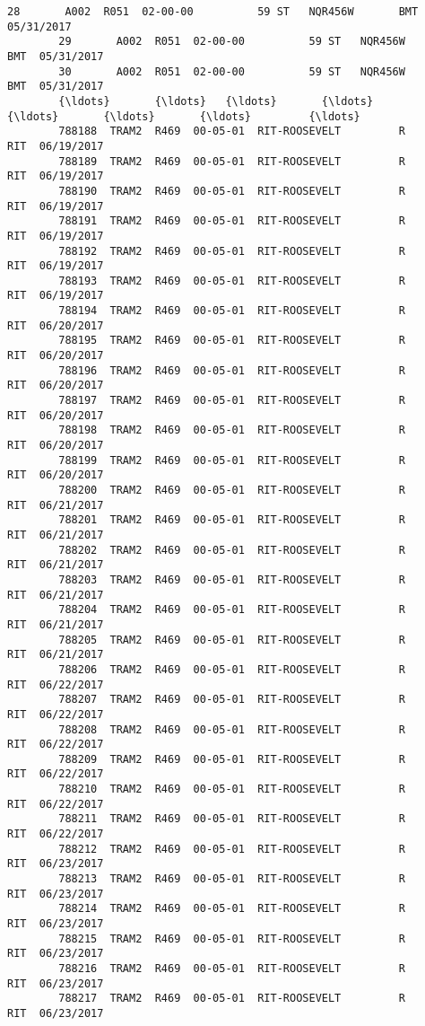 \documentclass[11pt]{article}
\begin{document}
\begin{Verbatim}[commandchars=\\\{\}]
        28       A002  R051  02-00-00          59 ST   NQR456W       BMT  05/31/2017   
        29       A002  R051  02-00-00          59 ST   NQR456W       BMT  05/31/2017   
        30       A002  R051  02-00-00          59 ST   NQR456W       BMT  05/31/2017   
        {\ldots}       {\ldots}   {\ldots}       {\ldots}            {\ldots}       {\ldots}       {\ldots}         {\ldots}   
        788188  TRAM2  R469  00-05-01  RIT-ROOSEVELT         R       RIT  06/19/2017   
        788189  TRAM2  R469  00-05-01  RIT-ROOSEVELT         R       RIT  06/19/2017   
        788190  TRAM2  R469  00-05-01  RIT-ROOSEVELT         R       RIT  06/19/2017   
        788191  TRAM2  R469  00-05-01  RIT-ROOSEVELT         R       RIT  06/19/2017   
        788192  TRAM2  R469  00-05-01  RIT-ROOSEVELT         R       RIT  06/19/2017   
        788193  TRAM2  R469  00-05-01  RIT-ROOSEVELT         R       RIT  06/19/2017   
        788194  TRAM2  R469  00-05-01  RIT-ROOSEVELT         R       RIT  06/20/2017   
        788195  TRAM2  R469  00-05-01  RIT-ROOSEVELT         R       RIT  06/20/2017   
        788196  TRAM2  R469  00-05-01  RIT-ROOSEVELT         R       RIT  06/20/2017   
        788197  TRAM2  R469  00-05-01  RIT-ROOSEVELT         R       RIT  06/20/2017   
        788198  TRAM2  R469  00-05-01  RIT-ROOSEVELT         R       RIT  06/20/2017   
        788199  TRAM2  R469  00-05-01  RIT-ROOSEVELT         R       RIT  06/20/2017   
        788200  TRAM2  R469  00-05-01  RIT-ROOSEVELT         R       RIT  06/21/2017   
        788201  TRAM2  R469  00-05-01  RIT-ROOSEVELT         R       RIT  06/21/2017   
        788202  TRAM2  R469  00-05-01  RIT-ROOSEVELT         R       RIT  06/21/2017   
        788203  TRAM2  R469  00-05-01  RIT-ROOSEVELT         R       RIT  06/21/2017   
        788204  TRAM2  R469  00-05-01  RIT-ROOSEVELT         R       RIT  06/21/2017   
        788205  TRAM2  R469  00-05-01  RIT-ROOSEVELT         R       RIT  06/21/2017   
        788206  TRAM2  R469  00-05-01  RIT-ROOSEVELT         R       RIT  06/22/2017   
        788207  TRAM2  R469  00-05-01  RIT-ROOSEVELT         R       RIT  06/22/2017   
        788208  TRAM2  R469  00-05-01  RIT-ROOSEVELT         R       RIT  06/22/2017   
        788209  TRAM2  R469  00-05-01  RIT-ROOSEVELT         R       RIT  06/22/2017   
        788210  TRAM2  R469  00-05-01  RIT-ROOSEVELT         R       RIT  06/22/2017   
        788211  TRAM2  R469  00-05-01  RIT-ROOSEVELT         R       RIT  06/22/2017   
        788212  TRAM2  R469  00-05-01  RIT-ROOSEVELT         R       RIT  06/23/2017   
        788213  TRAM2  R469  00-05-01  RIT-ROOSEVELT         R       RIT  06/23/2017   
        788214  TRAM2  R469  00-05-01  RIT-ROOSEVELT         R       RIT  06/23/2017   
        788215  TRAM2  R469  00-05-01  RIT-ROOSEVELT         R       RIT  06/23/2017   
        788216  TRAM2  R469  00-05-01  RIT-ROOSEVELT         R       RIT  06/23/2017   
        788217  TRAM2  R469  00-05-01  RIT-ROOSEVELT         R       RIT  06/23/2017   
        

\end{Verbatim}
\end{document}
